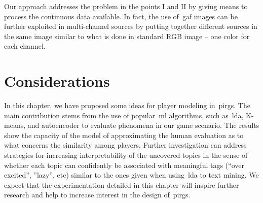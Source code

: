 Our approach addresses the problem in the points I and II by giving means to process the continuous data available. In fact, the use of~\gls{gaf} images can be further exploited in multi-channel sources by putting together different sources in the same image similar to what is done in standard RGB image -- one color for each channel. 


\section{Considerations}
In this chapter, we have proposed some ideas for player modeling in~\gls{pirg}s. The main contribution stems from the use of popular~\gls{ml} algorithms, such as~\gls{lda}, K-means, and autoencoder to evaluate phenomena in our game scenario. The results show the capacity of the model of approximating the human evaluation as to what concerns the similarity among players. Further investigation can address strategies for increasing interpretability of the uncovered topics in the sense of whether each topic can confidently be associated with meaningful tags (\eg ``over excited'', ''lazy'', etc) similar to the ones given when using~\gls{lda} to text mining. We expect that the experimentation detailed in this chapter will inspire further research and help to increase interest in the design of~\gls{pirg}s.
